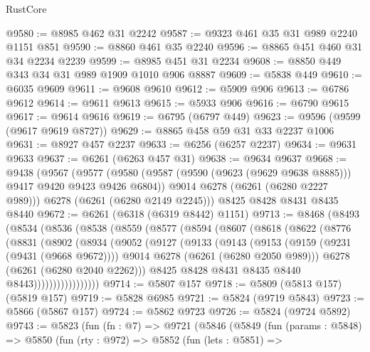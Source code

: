 \begin{lexlean}{RustCore}
\begin{coremodule}
@9580 := @8985 @462 @31 @2242
@9587 := @9323 @461 @35 @31 @989 @2240 @1151 @851
@9590 := @8860 @461 @35 @2240
@9596 := @8865 @451 @460 @31 @34 @2234 @2239
@9599 := @8985 @451 @31 @2234
@9608 := @8850 @449 @343 @34 @31 @989 @1909 @1010 @906 @8887
@9609 := @5838 @449
@9610 := @6035 @9609
@9611 := @9608 @9610
@9612 := @5909 @906
@9613 := @6786 @9612
@9614 := @9611 @9613
@9615 := @5933 @906
@9616 := @6790 @9615
@9617 := @9614 @9616
@9619 := @6795 (@6797 @449)
@9623 := @9596 (@9599 (@9617 @9619 @8727))
@9629 := @8865 @458 @59 @31 @33 @2237 @1006
@9631 := @8927 @457 @2237
@9633 := @6256 (@6257 @2237)
@9634 := @9631 @9633
@9637 := @6261 (@6263 @457 @31)
@9638 := @9634 @9637
@9668 := @9438
    (@9567
      (@9577
        (@9580 (@9587 (@9590 (@9623 (@9629 @9638 @8885))) @9417 @9420 @9423 @9426 @6804))
        @9014
        @6278
        (@6261 (@6280 @2227 @989)))
      @6278
      (@6261 (@6280 @2149 @2245)))
    @8425
    @8428
    @8431
    @8435
    @8440
@9672 := @6261 (@6318 (@6319 @8442) @1151)
@9713 := @8468
    (@8493
      (@8534
        (@8536
          (@8538
            (@8559
              (@8577
                (@8594
                  (@8607
                    (@8618
                      (@8622
                        (@8776
                          (@8831
                            (@8902
                              (@8934
                                (@9052
                                  (@9127
                                    (@9133
                                      (@9143
                                        (@9153
                                          (@9159 (@9231 (@9431 (@9668 @9672))))
                                          @9014
                                          @6278
                                          (@6261 (@6280 @2050 @989)))
                                        @6278
                                        (@6261 (@6280 @2040 @2262)))
                                      @8425
                                      @8428
                                      @8431
                                      @8435
                                      @8440
                                      @8443)))))))))))))))))
@9714 := @5807 @157
@9718 := @5809 (@5813 @157) (@5819 @157)
@9719 := @5828 @6985
@9721 := @5824 (@9719 @5843)
@9723 := @5866 (@5867 @157)
@9724 := @5862 @9723
@9726 := @5824 (@9724 @5892)
@9743 := @5823
    (fun (fn : @7) =>
    @9721
      (@5846
        (@5849
          (fun (params : @5848) =>
          @5850
            (fun (rty : @972) =>
            @5852
              (fun (lets : @5851) =>

\end{coremodule}
\end{lexlean}
